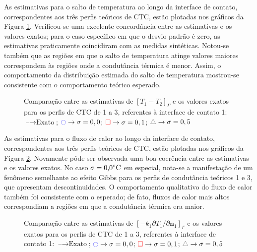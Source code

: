 As estimativas para o salto de temperatura ao longo da interface de contato, correspondentes aos três perfis teóricos de CTC, estão plotadas nos gráficos da Figura \ref{figura_delta_temperaturas_interface_01}. Verificou-se uma excelente concordância entre as estimativas e os valores exatos; para o caso específico em que o desvio padrão é zero, as estimativas praticamente coincidiram com as medidas sintéticas. Notou-se também que as regiões em que o salto de temperatura atinge valores maiores correspondem às regiões onde a condutância térmica é menor. Assim, o comportamento da distribuição estimada do salto de temperatura mostrou-se consistente com o comportamento teórico esperado.
\begin{figure}[H]
	\caption{Comparação entre as estimativas de $[T_1 - T_2]_\Gamma$ e os valores exatos para os perfis de CTC de 1 a 3, referentes à interface de contato 1: $\text{--} \rightarrow \text{Exato}$; $\textcolor{blue}{\ocircle} \rightarrow \sigma = 0,0$; $\textcolor{red}{\square} \rightarrow \sigma = 0,1$; $\textcolor{gray}{\triangle} \rightarrow \sigma = 0,5$}
	\label{figura_delta_temperaturas_interface_01}
\end{figure}

As estimativas para o fluxo de calor ao longo da interface de contato, correspondentes aos três perfis teóricos de CTC, estão plotadas nos gráficos da Figura \ref{figura_fluxo_calor_interface_01}. Novamente pôde ser observada uma boa coerência entre as estimativas e os valores exatos. No caso $\sigma = \text{0,0}\celsius$ em especial, nota-se a manifestação de um fenômeno semelhante ao efeito Gibbs\citep{livro_boyce} para os perfis de condutância teóricos 1 e 3, que apresentam descontinuidades. O comportamento qualitativo do fluxo de calor também foi consistente com o esperado; de fato, fluxos de calor mais altos correspondiam a regiões em que a condutância térmica era maior.
 
\begin{figure}[H]
	\caption{Comparação entre as estimativas de $[-k_1 {\partial T_1}/{\partial\mathbf{n}_1}]_\Gamma$ e os valores exatos para os perfis de CTC de 1 a 3, referentes à interface de contato 1: $\text{--} \rightarrow \text{Exato}$; $\textcolor{blue}{\ocircle} \rightarrow \sigma = 0,0$; $\textcolor{red}{\square} \rightarrow \sigma = 0,1$; $\textcolor{gray}{\triangle} \rightarrow \sigma = 0,5$}
	\label{figura_fluxo_calor_interface_01}
\end{figure}

